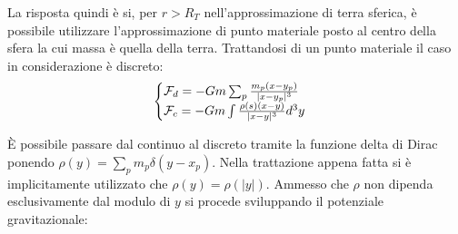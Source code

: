 \documentclass[Main.tex]{subfiles}
\begin{document}
La risposta quindi è si, per $r>R_T$ nell'approssimazione di terra sferica, è possibile utilizzare l'approssimazione di punto materiale posto al centro della sfera la cui massa è quella della terra. Trattandosi di un punto materiale il caso in considerazione è discreto:
\begin{equation}
	\begin{cases}
		\mathcal{F}_{d} = -Gm \sum_{p} \frac{m_p(x-y_p)}{|x-y_p|^3}\\
		\mathcal{F}_{c}=-Gm \int \frac{\rho(s) (x-y)}{|x-y|^3}d^3y
	\end{cases}
\end{equation}

È possibile passare dal continuo al discreto tramite la funzione delta di Dirac ponendo $\rho(y)= \sum_p m_p \delta (y- x_p)$. Nella trattazione appena fatta si è implicitamente utilizzato che $\rho(y) = \rho(|y|)$. Ammesso che $\rho$ non dipenda esclusivamente dal modulo di $y$ si procede sviluppando il potenziale gravitazionale:

\begin{comment}
\begin{gather}
	U(x):= - Gm \int \frac{\rho(y) d^3y }{|x-y|}= \\\overset{|x| \gg 1}{\overset{\downarrow}{=}} -Gm \left[ \frac{\int \rho(s) d^3y}{|x|} + \underbrace{\frac{1}{|x|^2} \int \rho(y) ( y \cdot \hat x) d^3y}_{\text{dipolo}} + \underbrace{\frac{1}{|x|^3} \int \rho(y) \frac{3 ( y \cdot \hat x)^2 - |y|^2}{2} d^3y}_{\text{quadrupolo}} + O\left( \frac{1}{|x|^4} \right) \right]
\end{gather}
\end{comment}
\end{document}
